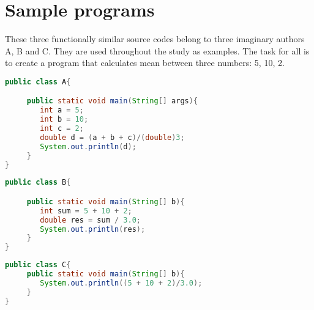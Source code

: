 \documentclass[english, grading]{tktltiki2}
\theoremstyle{definition}
\theoremstyle{remark}
\numberwithin{equation}{section} %
\begin{document}

\newpage
\appendix
% 

 
\lstset{style=mystyle}

\section{Sample programs} \label{appendix:programs}

These three functionally similar source codes belong to three imaginary authors A, B and C. They are used throughout the study as examples. The task for all is to create a program that calculates mean between three numbers: 5, 10, 2.

\begin{lstlisting}[language=Java, caption=Java example belonging to author A]
public class A{

     public static void main(String[] args){
        int a = 5;
        int b = 10;
        int c = 2;
        double d = (a + b + c)/(double)3;
        System.out.println(d);
     }
}
\end{lstlisting}

\begin{lstlisting}[language=Java, caption=Java example belonging to author B]
public class B{

     public static void main(String[] b){
        int sum = 5 + 10 + 2;
        double res = sum / 3.0;
        System.out.println(res);
     }
}
\end{lstlisting}

\begin{lstlisting}[language=Java, caption=Java example belonging to author C]
public class C{
     public static void main(String[] b){
        System.out.println((5 + 10 + 2)/3.0);
     }
}
\end{lstlisting}
\end{document}
